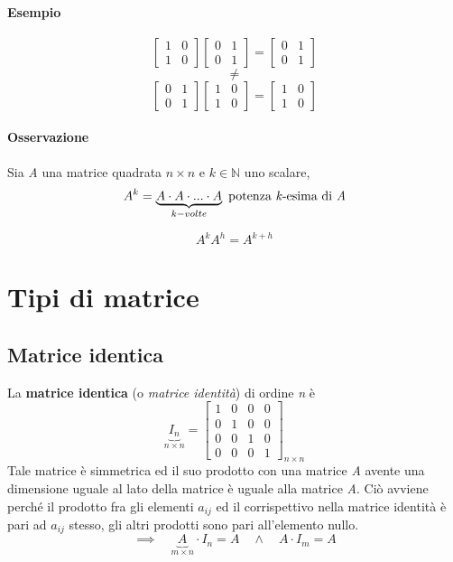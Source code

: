 			\paragraph{Esempio}
			$$
			\begin{bmatrix}
				1 & 0 \\ 
				1 & 0
			\end{bmatrix}
			\begin{bmatrix}
				0 & 1 \\ 
				0& 1
			\end{bmatrix}
			=
			\begin{bmatrix}
				0 & 1 \\
				0 & 1
			\end{bmatrix}
			$$ $$ \neq $$ $$
			\begin{bmatrix}
				0 & 1 \\
				0 & 1
			\end{bmatrix}
			\begin{bmatrix}
				1 & 0 \\ 
				1 & 0
			\end{bmatrix}
			=
			\begin{bmatrix}
				1 & 0 \\ 
				1 & 0
			\end{bmatrix}
			$$
			
			\paragraph{Osservazione} Sia \textit{A} una matrice quadrata $ n \times n $ e $ k \in \mathbb{N} $ uno scalare,
			$$ A^k = \underbrace{A \cdot A \cdot ... \cdot A}_{k-volte} \text{  potenza \textit{k}-esima di \textit{A}}$$
			
			$$ A^k A^h = A^{k+h} $$
	
	\section{Tipi di matrice}
	
		\subsection{Matrice identica}
			La \textbf{matrice identica} (o \textit{matrice identità}) di ordine \textit{n} è
			$$ 
			\underbrace{I_n}_{n \times n} =
			\begin{bmatrix}
				1 & 0 & 0 & 0 \\
				0 & 1 & 0 & 0 \\
				0 & 0 & 1 & 0 \\
				0 & 0 & 0 & 1
			\end{bmatrix}_{n \times n}
			$$
			Tale matrice è simmetrica ed il suo prodotto con una matrice \textit{A} avente una dimensione uguale al lato della matrice è uguale alla matrice \textit{A}. Ciò avviene perché il prodotto fra gli elementi $ a_{ij} $ ed il corrispettivo nella matrice identità è pari ad $ a_{ij} $ stesso, gli altri prodotti sono pari all'elemento nullo.  
			$$ \implies \quad \underbrace{A}_{m \times n} \cdot I_n = A \quad \wedge \quad A \cdot I_m = A $$
		
